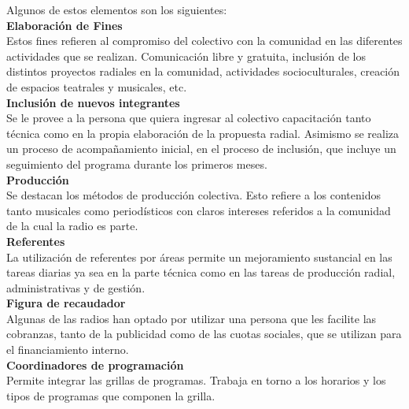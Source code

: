 Algunos de estos elementos son los siguientes:\\

\textbf{Elaboración de Fines}\\

Estos fines refieren al compromiso del colectivo con la comunidad en las diferentes actividades que se realizan. Comunicación libre y gratuita, inclusión de los distintos proyectos radiales en la comunidad, actividades socioculturales, creación de espacios teatrales y musicales, etc.\\

\textbf{Inclusión de nuevos integrantes}\\

Se le provee a la persona que quiera ingresar al colectivo capacitación tanto técnica como en la propia elaboración de la propuesta radial. Asimismo se realiza un proceso de acompañamiento inicial, en el proceso de inclusión, que incluye un seguimiento del programa durante los primeros meses.\\

\textbf{Producción}\\

Se destacan los métodos de producción colectiva. Esto refiere a los contenidos tanto musicales como periodísticos con claros intereses referidos a la comunidad de la cual la radio es parte.\\

\textbf{Referentes}\\

La utilización de referentes por áreas permite un mejoramiento sustancial en las tareas diarias  ya sea en la parte técnica como en las tareas de producción radial, administrativas y de gestión.\\

\textbf{Figura de recaudador}\\

Algunas de las radios han optado por utilizar una persona que les facilite las cobranzas, tanto de la publicidad como de las cuotas sociales, que se utilizan para el financiamiento interno.\\

\textbf{Coordinadores de programación}\\

Permite integrar las grillas de programas. Trabaja en torno a los horarios y los tipos de programas que componen la grilla.\\
